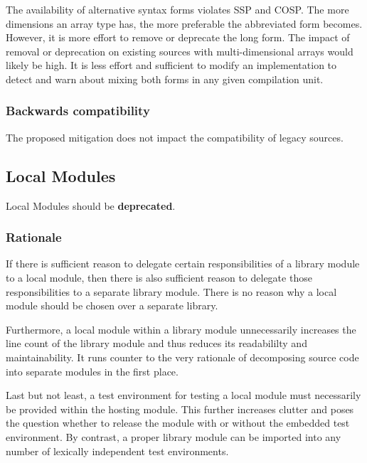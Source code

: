 \documentclass[10pt,a4paper]{article} %
\begin{document}
\par\noindent The availability of alternative syntax forms violates SSP and COSP. The more dimensions an array type has, the more preferable the abbreviated form becomes. However, it is more effort to remove or deprecate the long form. The impact of removal or deprecation on existing sources with multi-dimensional arrays would likely be high. It is less effort and sufficient to modify an implementation to detect and warn about mixing both forms in any given compilation unit.

\subsubsection{Backwards compatibility}

The proposed mitigation does not impact the compatibility of legacy sources.


\subsection{Local Modules}

Local Modules should be \textbf{deprecated}.

\subsubsection{Rationale}
If there is sufficient reason to delegate certain responsibilities of a library module to a local module, then there is also sufficient reason to delegate those responsibilities to a separate library module. There is no reason why a local module should be chosen over a separate library.

Furthermore, a local module within a library module unnecessarily increases the line count of the library module and thus reduces its readabililty and maintainability. It runs counter to the very rationale of decomposing source code into separate modules in the first place.

Last but not least, a test environment for testing a local module must necessarily be provided within the hosting module.  This further increases clutter and poses the question whether to release the module with or without the embedded test environment. By contrast, a proper library module can be imported into any number of lexically independent test environments.
\end{document}
